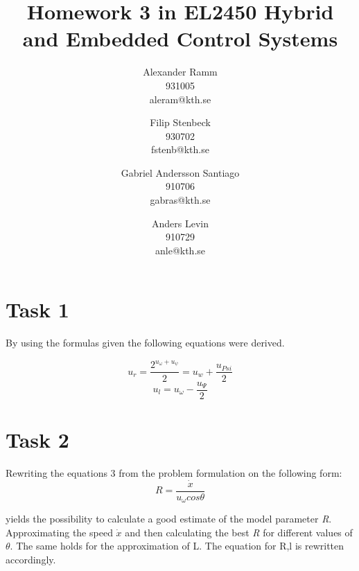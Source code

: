 \documentclass[a4paper,12pt,oneside,onecolumn]{article} %
\begin{document}

\title{Homework 3 in EL2450 Hybrid and Embedded Control Systems}
\author{
  Alexander Ramm \\ 931005 \\ aleram@kth.se 
  \and 
  Filip Stenbeck \\ 930702 \\ fstenb@kth.se
  \and
  Gabriel Andersson Santiago \\ 910706 \\ gabras@kth.se
  \and
  Anders Levin \\ 910729 \\ anle@kth.se
  \and
  }

\maketitle                     %
\newpage







\section*{Task 1}

By using the formulas given the following equations were derived.

\begin{equation}
u_r = \frac{2^{u_{\omega} + u_{\psi}}}{2} = u_w + \frac{u_{Psi}}{2}
\end{equation}
\begin{equation}
u_l = u_\omega - \frac{u_\Psi}{2}
\end{equation}

\section*{Task 2}


Rewriting the equations 3 from the problem formulation on the following form:
\begin{equation}
R = \frac{\dot{x}}{u_\omega cos \theta}
\end{equation}

yields the possibility to calculate a good estimate of the model parameter \emph{R}. Approximating the speed $\dot{x}$ and then calculating the best \emph{R} for different values of $\theta$. The same holds for the approximation of L. The equation for R,l is rewritten accordingly. 
\end{document}
